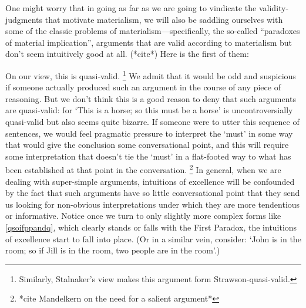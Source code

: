 \documentclass[If.tex]{subfiles}
\begin{document}

One might worry that in going as far as we are going to vindicate the validity-judgments that motivate materialism, we will also be saddling ourselves with some of the classic problems of materialism---specifically, the so-called “paradoxes of material implication”, arguments that are valid according to materialism but don't seem intuitively good at all.  (*cite*)  Here is the first of them:
\begin{prop}
\end{prop}
On our view, this is quasi-valid.%
\footnote{Similarly, Stalnaker's view makes this argument form Strawson-quasi-valid.}
We admit that it would be odd and suspicious if someone actually produced such an argument in the course of any piece of reasoning. But we don't think this is a good reason to deny that such arguments are quasi-valid: for ‘This is a horse; so this must be a horse’ is uncontroversially quasi-valid but also seems quite bizarre. If someone were to utter this sequence of sentences, we would feel pragmatic pressure to interpret the ‘must’ in some way that would give the conclusion some conversational point, and this will require some interpretation that doesn't tie the ‘must’ in a flat-footed way to what has been established at that point in the conversation.%
\footnote{*cite Mandelkern on the need for a salient argument*} 
In general, when we are dealing with super-simple arguments, intuitions of excellence will be confounded by the fact that such arguments have so little conversational point that they send us looking for non-obvious interpretations under which they are more tendentious or informative. Notice once we turn to only slightly more complex forms like \ref{qsoifppandq}, which clearly stands or falls with the First Paradox, the intuitions of excellence start to fall into place.  (Or in a similar vein, consider: ‘John is in the room; so if Jill is in the room, two people are in the room’.)
\end{document}
